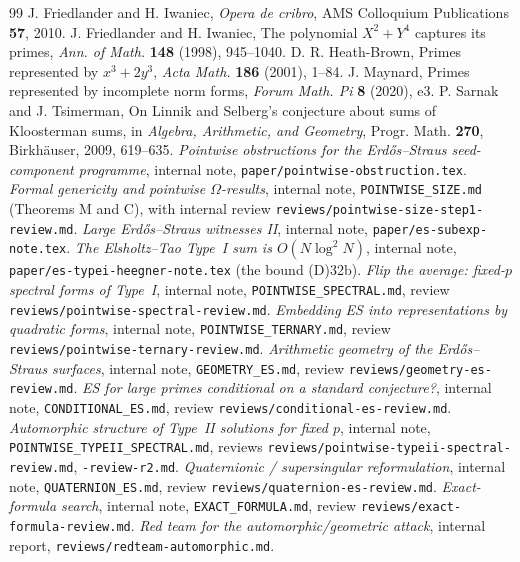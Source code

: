 \documentclass[10pt,reqno]{amsart}
\theoremstyle{definition}
\numberwithin{equation}{section}
\begin{document}
\begin{thebibliography}{99}
 J. Friedlander and H. Iwaniec, \emph{Opera de cribro}, AMS Colloquium Publications \textbf{57}, 2010.
 J. Friedlander and H. Iwaniec, The polynomial $X^2+Y^4$ captures its primes, \emph{Ann. of Math.} \textbf{148} (1998), 945--1040.
 D. R. Heath-Brown, Primes represented by $x^3+2y^3$, \emph{Acta Math.} \textbf{186} (2001), 1--84.
 J. Maynard, Primes represented by incomplete norm forms, \emph{Forum Math. Pi} \textbf{8} (2020), e3.
 P. Sarnak and J. Tsimerman, On Linnik and Selberg's conjecture about sums of Kloosterman sums, in \emph{Algebra, Arithmetic, and Geometry}, Progr. Math. \textbf{270}, Birkh\"auser, 2009, 619--635.
 \emph{Pointwise obstructions for the Erd\H{o}s--Straus seed-component programme}, internal note, \texttt{paper/pointwise-obstruction.tex}.
 \emph{Formal genericity and pointwise $\Omega$-results}, internal note, \texttt{POINTWISE\_SIZE.md} (Theorems M and C), with internal review \texttt{reviews/pointwise-size-step1-review.md}.
 \emph{Large Erd\H{o}s--Straus witnesses II}, internal note, \texttt{paper/es-subexp-note.tex}.
 \emph{The Elsholtz--Tao Type~I sum is $O(N\log^2N)$}, internal note, \texttt{paper/es-typei-heegner-note.tex} (the bound (D)32b).
 \emph{Flip the average: fixed-$p$ spectral forms of Type~I}, internal note, \texttt{POINTWISE\_SPECTRAL.md}, review \texttt{reviews/pointwise-spectral-review.md}.
 \emph{Embedding ES into representations by quadratic forms}, internal note, \texttt{POINTWISE\_TERNARY.md}, review \texttt{reviews/pointwise-ternary-review.md}.
 \emph{Arithmetic geometry of the Erd\H{o}s--Straus surfaces}, internal note, \texttt{GEOMETRY\_ES.md}, review \texttt{reviews/geometry-es-review.md}.
 \emph{ES for large primes conditional on a standard conjecture?}, internal note, \texttt{CONDITIONAL\_ES.md}, review \texttt{reviews/conditional-es-review.md}.
 \emph{Automorphic structure of Type~II solutions for fixed $p$}, internal note, \texttt{POINTWISE\_TYPEII\_SPECTRAL.md}, reviews \texttt{reviews/pointwise-typeii-spectral-review.md}, \texttt{-review-r2.md}.
 \emph{Quaternionic / supersingular reformulation}, internal note, \texttt{QUATERNION\_ES.md}, review \texttt{reviews/quaternion-es-review.md}.
 \emph{Exact-formula search}, internal note, \texttt{EXACT\_FORMULA.md}, review \texttt{reviews/exact-formula-review.md}.
 \emph{Red team for the automorphic/geometric attack}, internal report, \texttt{reviews/redteam-automorphic.md}.

\end{thebibliography}
\end{document}
